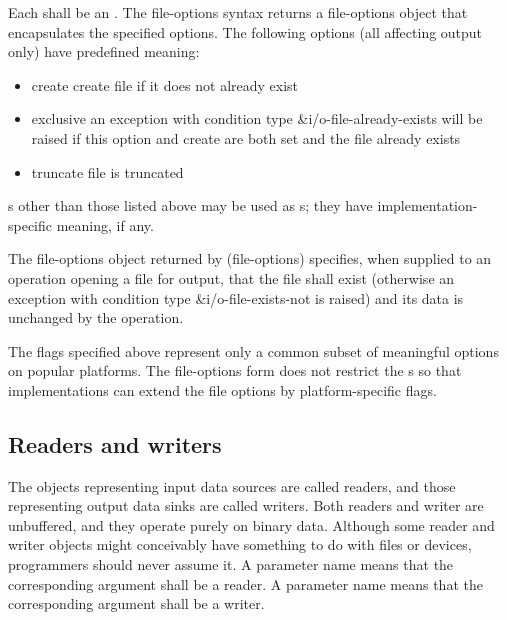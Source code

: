 \begin{entry}{%
}

Each  shall be an .
The {\cf file-options} syntax returns a file-options object that 
encapsulates the
specified options. The following options (all affecting output
only) have predefined meaning:

\begin{itemize}   
\item {\cf create} create file if it does not already exist
\item {\cf exclusive} an exception with condition type
  {\cf\&i/o-file-already-exists} will be raised if this
  option and {\cf create} are both set and the file already exists
\item {\cf truncate}
  file is truncated
\end{itemize}

s other than those listed above may be used as s;
they have implementation-specific meaning, if any.

The file-options object returned by {\cf (file-options)} specifies,
when supplied to an operation opening a file for output, that the file
shall exist (otherwise an exception with condition type
{\cf\&i/o-file-exists-not} is raised) and its data is unchanged by the
operation.

\begin{rationale}
  The flags specified above represent only a common subset of
  meaningful options on popular platforms.  The {\cf file-options}
  form does not restrict the s so that
  implementations can extend the file options by platform-specific
  flags.
\end{rationale}
\end{entry}   

\subsection{Readers and writers}

The objects representing input data sources are called readers, and
those representing output data sinks are called writers.
Both readers and writer are unbuffered, and they operate purely on binary data.  
Although some
reader and writer objects might conceivably have something to do with
files or devices, programmers should never assume it.
A  parameter name means that the
corresponding argument shall be a reader.
A  parameter name means that the
corresponding argument shall be a writer.

